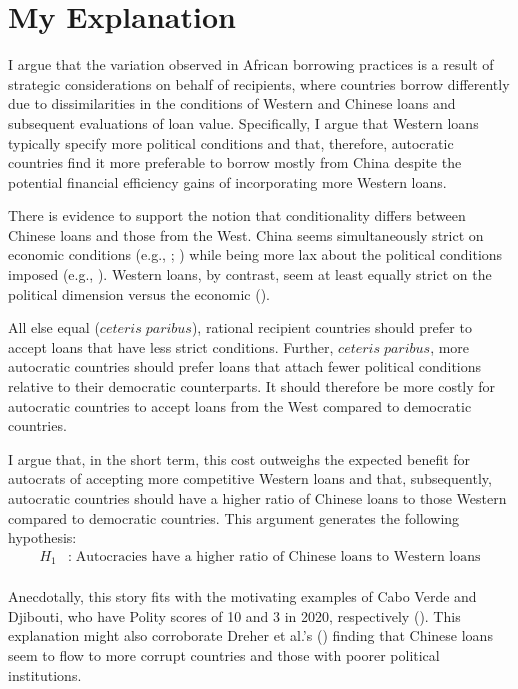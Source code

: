 \documentclass[12pt]{article}
\begin{document}
\section*{My Explanation}
I argue that the variation observed in African borrowing practices is a result of strategic considerations on behalf of recipients, where countries borrow differently due to dissimilarities in the conditions of Western and Chinese loans and subsequent evaluations of loan value. Specifically, I argue that Western loans typically specify more political conditions and that, therefore, autocratic countries find it more preferable to borrow mostly from China despite the potential financial efficiency gains of incorporating more Western loans.

There is evidence to support the notion that conditionality differs between Chinese loans and those from the West. China seems simultaneously strict on economic conditions (e.g., \cite{dreher2018}; \cite{theeconomist2022}) while being more lax about the political conditions imposed (e.g., \cite{dreher2018}). Western loans, by contrast, seem at least equally strict on the political dimension versus the economic (\cite{hernandez2017}). 

All else equal ($ceteris\;paribus$), rational recipient countries should prefer to accept loans that have less strict conditions. %
Further, $ceteris\;paribus$, more autocratic countries should prefer loans that attach fewer political conditions relative to their democratic counterparts. %
It should therefore be more costly for autocratic countries to accept loans from the West compared to democratic countries. 

I argue that, in the short term, this cost outweighs the expected benefit for autocrats of accepting more competitive Western loans and that, subsequently, autocratic countries should have a higher ratio of Chinese loans to those Western compared to democratic countries. This argument generates the following hypothesis:
\begin{align*}
    H_{1}&:\;\text{Autocracies have a higher ratio of Chinese loans to Western loans}\\
\end{align*}

Anecdotally, this story fits with the motivating examples of Cabo Verde and Djibouti, who have Polity scores of 10 and 3 in 2020, respectively (\cite{marshall2018}).
This explanation might also corroborate Dreher et al.'s (\citeyear{dreher2018}) finding that Chinese loans seem to flow to more corrupt countries and those with poorer political institutions.
\end{document}
